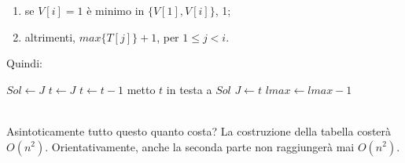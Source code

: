 \begin{enumerate}
	\item se $V[i]=1$ è minimo in $\{V[1], V[i]\}$, 1;
	\item altrimenti, $max\{T[j]\}+1$, per $1\leq j < i$.
\end{enumerate}
Quindi:
\begin{algorithm}
	\label{alg:subDIVpt2-2}
	\begin{algorithmic}
			\State $Sol \gets J$
				\State $t \gets J$
					\State $t \gets t-1$
				\EndWhile
				\State metto $t$ in testa a $Sol$
				\State $J \gets t$
				\State $lmax \gets lmax-1$
			\EndWhile
		\EndFunction
	\end{algorithmic}
\end{algorithm} \hfill \\
Asintoticamente tutto questo quanto costa? La costruzione della tabella costerà $O(n^2)$. Orientativamente, anche la seconda parte non raggiungerà mai $O(n^2)$.